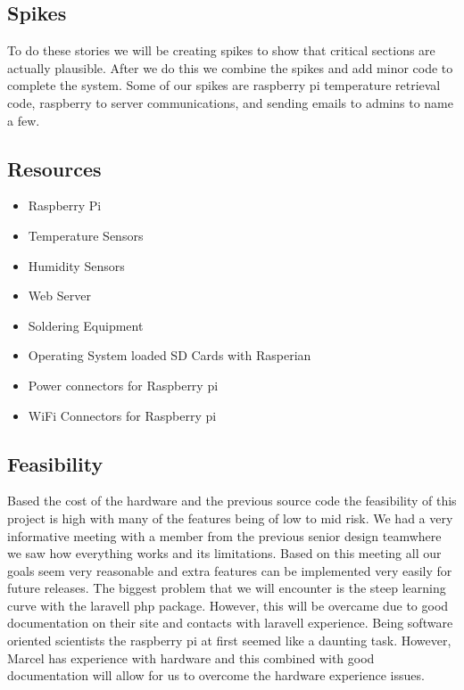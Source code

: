 \documentclass{report}
\begin{document}
\subsection*{Spikes}
To do these stories we will be creating spikes to show that critical sections are actually plausible. After we do this we combine the spikes and add minor code to complete the system. Some of our spikes are raspberry pi temperature retrieval code, raspberry to server communications, and sending emails to admins to name a few. 
\newpage
\subsection*{Resources}
\begin{itemize}
\item Raspberry Pi
\item Temperature Sensors
\item Humidity Sensors
\item Web Server
\item Soldering Equipment
\item Operating System loaded SD Cards with Rasperian
\item Power connectors for Raspberry pi
\item WiFi Connectors for Raspberry pi
\end{itemize}
\newpage
\subsection*{Feasibility}
Based the cost of the hardware and the previous source code the feasibility of this project is high with many of the features being of low to mid risk. 
We had a very informative meeting with a member from the previous senior design teamwhere we saw how everything works and its limitations.
Based on this meeting all our goals seem very reasonable and extra features can be implemented very easily for future releases.
The biggest problem that we will encounter is the steep learning curve with the laravell php package.
However, this will be overcame due to good documentation on their site and contacts with laravell experience.
Being software oriented scientists the raspberry pi at first seemed like a daunting task. 
However, Marcel has experience with hardware and this combined with good documentation will allow for us to overcome the hardware experience issues.
\end{document}
